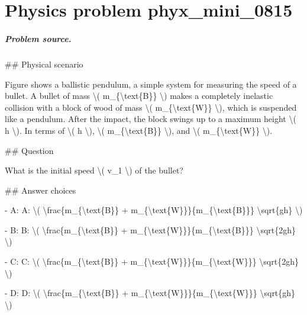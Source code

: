 
\chapter{Physics problem phyx\_mini\_0815}
\label{ch:PhyXMiniProblems_problem_phyx_mini_0815}

\paragraph{Problem source.}
\#\# Physical scenario

Figure shows a ballistic pendulum, a simple system for measuring the speed of a bullet. A bullet of mass \textbackslash{}( m\_\{\textbackslash{}text\{B\}\} \textbackslash{}) makes a completely inelastic collision with a block of wood of mass \textbackslash{}( m\_\{\textbackslash{}text\{W\}\} \textbackslash{}), which is suspended like a pendulum. After the impact, the block swings up to a maximum height \textbackslash{}( h \textbackslash{}). In terms of \textbackslash{}( h \textbackslash{}), \textbackslash{}( m\_\{\textbackslash{}text\{B\}\} \textbackslash{}), and \textbackslash{}( m\_\{\textbackslash{}text\{W\}\} \textbackslash{}).

\#\# Question

What is the initial speed \textbackslash{}( v\_1 \textbackslash{}) of the bullet?

\#\# Answer choices

- A: A: \textbackslash{}( \textbackslash{}frac\{m\_\{\textbackslash{}text\{B\}\} + m\_\{\textbackslash{}text\{W\}\}\}\{m\_\{\textbackslash{}text\{B\}\}\} \textbackslash{}sqrt\{gh\} \textbackslash{})

- B: B: \textbackslash{}( \textbackslash{}frac\{m\_\{\textbackslash{}text\{B\}\} + m\_\{\textbackslash{}text\{W\}\}\}\{m\_\{\textbackslash{}text\{B\}\}\} \textbackslash{}sqrt\{2gh\} \textbackslash{})

- C: C: \textbackslash{}( \textbackslash{}frac\{m\_\{\textbackslash{}text\{B\}\} + m\_\{\textbackslash{}text\{W\}\}\}\{m\_\{\textbackslash{}text\{W\}\}\} \textbackslash{}sqrt\{2gh\} \textbackslash{})

- D: D: \textbackslash{}( \textbackslash{}frac\{m\_\{\textbackslash{}text\{B\}\} + m\_\{\textbackslash{}text\{W\}\}\}\{m\_\{\textbackslash{}text\{W\}\}\} \textbackslash{}sqrt\{gh\} \textbackslash{})

